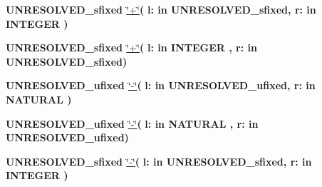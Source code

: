 \begin{DoxyCompactItemize}
\item 
{\bfseries {\bfseries \textcolor{vhdlchar}{U\+N\+R\+E\+S\+O\+L\+V\+E\+D\+\_\+sfixed}\textcolor{vhdlchar}{ }}} \hyperlink{class__fixed__pkg_a85a3dc07f1049b4642e6c837673edf13}{\char`\"{}+\char`\"{}}{\bfseries  ( }{\bfseries \textcolor{vhdlchar}{l\+: }\textcolor{stringliteral}{in }\textcolor{vhdlchar}{U\+N\+R\+E\+S\+O\+L\+V\+E\+D\+\_\+sfixed}}{\bfseries  , \textcolor{vhdlchar}{r\+: }\textcolor{stringliteral}{in }{\bfseries \textcolor{comment}{I\+N\+T\+E\+G\+E\+R}\textcolor{vhdlchar}{ }}}{\bfseries  )} 
\item 
{\bfseries {\bfseries \textcolor{vhdlchar}{U\+N\+R\+E\+S\+O\+L\+V\+E\+D\+\_\+sfixed}\textcolor{vhdlchar}{ }}} \hyperlink{class__fixed__pkg_a85a3dc07f1049b4642e6c837673edf13}{\char`\"{}+\char`\"{}}{\bfseries  ( }{\bfseries \textcolor{vhdlchar}{l\+: }\textcolor{stringliteral}{in }{\bfseries \textcolor{comment}{I\+N\+T\+E\+G\+E\+R}\textcolor{vhdlchar}{ }}}{\bfseries  , \textcolor{vhdlchar}{r\+: }\textcolor{stringliteral}{in }\textcolor{vhdlchar}{U\+N\+R\+E\+S\+O\+L\+V\+E\+D\+\_\+sfixed}}{\bfseries  )} 
\item 
{\bfseries {\bfseries \textcolor{vhdlchar}{U\+N\+R\+E\+S\+O\+L\+V\+E\+D\+\_\+ufixed}\textcolor{vhdlchar}{ }}} \hyperlink{class__fixed__pkg_a39970596105025f91b3839479d54d447}{\char`\"{}-\/\char`\"{}}{\bfseries  ( }{\bfseries \textcolor{vhdlchar}{l\+: }\textcolor{stringliteral}{in }\textcolor{vhdlchar}{U\+N\+R\+E\+S\+O\+L\+V\+E\+D\+\_\+ufixed}}{\bfseries  , \textcolor{vhdlchar}{r\+: }\textcolor{stringliteral}{in }{\bfseries \textcolor{comment}{N\+A\+T\+U\+R\+A\+L}\textcolor{vhdlchar}{ }}}{\bfseries  )} 
\item 
{\bfseries {\bfseries \textcolor{vhdlchar}{U\+N\+R\+E\+S\+O\+L\+V\+E\+D\+\_\+ufixed}\textcolor{vhdlchar}{ }}} \hyperlink{class__fixed__pkg_a39970596105025f91b3839479d54d447}{\char`\"{}-\/\char`\"{}}{\bfseries  ( }{\bfseries \textcolor{vhdlchar}{l\+: }\textcolor{stringliteral}{in }{\bfseries \textcolor{comment}{N\+A\+T\+U\+R\+A\+L}\textcolor{vhdlchar}{ }}}{\bfseries  , \textcolor{vhdlchar}{r\+: }\textcolor{stringliteral}{in }\textcolor{vhdlchar}{U\+N\+R\+E\+S\+O\+L\+V\+E\+D\+\_\+ufixed}}{\bfseries  )} 
\item 
{\bfseries {\bfseries \textcolor{vhdlchar}{U\+N\+R\+E\+S\+O\+L\+V\+E\+D\+\_\+sfixed}\textcolor{vhdlchar}{ }}} \hyperlink{class__fixed__pkg_ac2f01ba70fd51fb20393648e564e9cf8}{\char`\"{}-\/\char`\"{}}{\bfseries  ( }{\bfseries \textcolor{vhdlchar}{l\+: }\textcolor{stringliteral}{in }\textcolor{vhdlchar}{U\+N\+R\+E\+S\+O\+L\+V\+E\+D\+\_\+sfixed}}{\bfseries  , \textcolor{vhdlchar}{r\+: }\textcolor{stringliteral}{in }{\bfseries \textcolor{comment}{I\+N\+T\+E\+G\+E\+R}\textcolor{vhdlchar}{ }}}{\bfseries  )} 

\end{DoxyCompactItemize}
